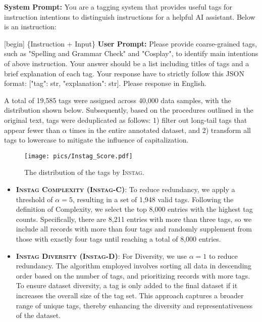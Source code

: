\begin{promptbox}
    \vspace{-0.2cm}
    \textbf{System Prompt:}\newline
    You are a tagging system that provides useful tags for instruction intentions to distinguish instructions for a helpful AI assistant. Below is an instruction:

    [begin]\newline
    \{Instruction + Input\}\newline
    [end]\newline
    \textbf{User Prompt:}\newline
    Please provide coarse-grained tags, such as "Spelling and Grammar Check" and "Cosplay", to identify main intentions of above instruction. Your answer should be a list including titles of tags and a brief explanation of each tag. Your response have to strictly follow this JSON format: [{"tag": str, "explanation": str}]. Please response in English.
\end{promptbox}

A total of 19,585 tags were assigned across 40,000 data samples, with the distribution shown below. Subsequently, based on the procedures outlined in the original text, tags were deduplicated as follows: 1) filter out long-tail tags that appear fewer than $\alpha$ times in the entire annotated dataset, and 2) transform all tags to lowercase to mitigate the influence of capitalization.

\begin{figure}[ht]
\centering
\texttt{[image: pics/Instag\_Score.pdf]}
\caption{The distribution of the tags by \textsc{Instag}.}
\label{fig:Instag}
\end{figure}

\begin{itemize}
    \item \textbf{\textsc{Instag Complexity (Instag-C)}}: To reduce redundancy, we apply a threshold of $\alpha = 5$, resulting in a set of 1,948 valid tags. Following the definition of Complexity, we select the top 8,000 entries with the highest tag counts. Specifically, there are 8,211 entries with more than three tags, so we include all records with more than four tags and randomly supplement from those with exactly four tags until reaching a total of 8,000 entries.
    \item \textbf{\textsc{Instag Diversity (Instag-D)}}: For Diversity, we use $\alpha = 1$ to reduce redundancy. The algorithm employed involves sorting all data in descending order based on the number of tags, and prioritizing records with more tags. To ensure dataset diversity, a tag is only added to the final dataset if it increases the overall size of the tag set. This approach captures a broader range of unique tags, thereby enhancing the diversity and representativeness of the dataset.
\end{itemize}

